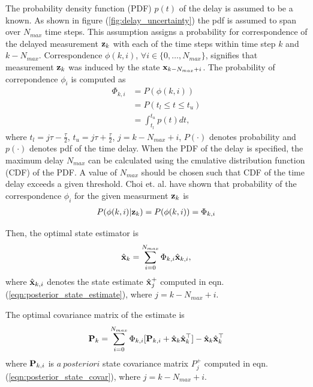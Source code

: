 The probability density function (PDF) $p(t)$ of the delay is assumed to be a known. As shown in figure (\ref{fig:delay_uncertainty}) the pdf is assumed to span over $N_{max}$ time steps. This assumption assigns a probability for correspondence of the delayed measurement $\mathbf{z}_k$ with each of the time steps within time step $k$ and $k- N_{max}$.
Correspondence $\phi(k,i)$, $\forall i \in \{0, \dots, N_{max}\}$, signifies that measurement $\mathbf{z}_k$ was induced by the state $\mathbf{x}_{k-N_{max}+i}$.
The probability of correpondence $\phi_i$ is computed as
\begin{align}
	\Phi_{k,i} &= P(\phi(k,i)) \\
	&= P(t_l \le t \le t_u) \\
	&= \int_{t_l}^{ t_u} p(t) dt,
\end{align}
where $t_l = {j\tau - \frac{\tau}{2}}$, $t_u = {j \tau + \frac{\tau}{2}}$, $j = k - N_{max} + i $, $P(\cdot)$ denotes probability and $p(\cdot)$ denotes pdf of the time delay. When the PDF of the delay is specified, the maximum delay $N_{max}$ can be calculated using the cmulative distribution function (CDF) of the PDF. 
A value of $N_{max}$ should be chosen such that CDF of the time delay exceeds a given threshold. 
Choi et. al. have shown that probability of the correspondence $\phi_i$ for the given measurment $\mathbf{z}_k$ is \cite{choi2012state}
\begin{align}
	P(\phi(k,i) | \mathbf{z}_k ) = P(\phi(k,i)) = \Phi_{k,i}
\end{align}

Then, the optimal state estimator is
\begin{align}
	\hat{\mathbf{x}}_k = \sum_{i=0}^{N_{max}} \Phi_{k,i} \hat{\mathbf{x}}_{k,i},
\end{align}
where $\hat{\mathbf{x}}_{k,i}$ denotes the state estimate $\hat{\mathbf{x}}_j^+$ computed in eqn. (\ref{eqn:posterior_state_estimate}), where $j = k - N_{max} + i$.

The optimal covariance matrix of the estimate is
\begin{align}
	\mathbf{P}_k = \sum_{i = 0}^{N_{max}} \Phi_{k,i} [\mathbf{P}_{k,i} + \hat{\mathbf{x}}_k \hat{\mathbf{x}}_k^\top] - \hat{\mathbf{x}}_k \hat{\mathbf{x}}_k^\top	
\end{align}
where $\mathbf{P}_{k,i}$ is $a~posteriori$ state covariance matrix $P_j^+$ computed in eqn. (\ref{eqn:posterior_state_covar}),  where $j = k - N_{max} + i$.



